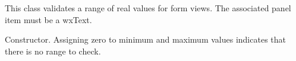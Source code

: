 \section{}\label{wxrealformvalidator}


This class validates a range of real values for form views. The associated panel item must be a wxText.



Constructor. Assigning zero to minimum and maximum values indicates that there is no range to check.


